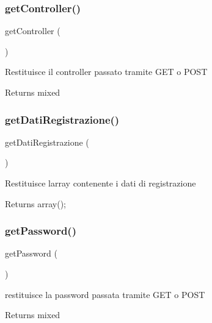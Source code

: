 \subsubsection{\texorpdfstring{get\+Controller()}{getController()}}
{\footnotesize\ttfamily get\+Controller (\begin{DoxyParamCaption}{ }\end{DoxyParamCaption})}

Restituisce il controller passato tramite G\+ET o P\+O\+ST

\begin{DoxyReturn}{Returns}
mixed 
\end{DoxyReturn}
\mbox{\label{class_v_registrazione_a41fedff206621545a767261d3566a32d}} 
\subsubsection{\texorpdfstring{get\+Dati\+Registrazione()}{getDatiRegistrazione()}}
{\footnotesize\ttfamily get\+Dati\+Registrazione (\begin{DoxyParamCaption}{ }\end{DoxyParamCaption})}

Restituisce l\textquotesingle{}array contenente i dati di registrazione

\begin{DoxyReturn}{Returns}
array(); 
\end{DoxyReturn}
\mbox{\label{class_v_registrazione_a04e0957baeb7acde9c0c86556da2d43f}} 
\subsubsection{\texorpdfstring{get\+Password()}{getPassword()}}
{\footnotesize\ttfamily get\+Password (\begin{DoxyParamCaption}{ }\end{DoxyParamCaption})}

restituisce la password passata tramite G\+ET o P\+O\+ST

\begin{DoxyReturn}{Returns}
mixed 
\end{DoxyReturn}
\mbox{\label{class_v_registrazione_a13871c4434338f02d6f8d430fa0597f2}} 
